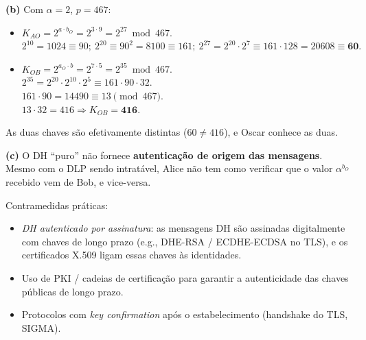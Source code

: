 \documentclass[12pt,a4paper]{article}
\begin{document}
\begin{exercicio}[breakable]
\begin{resposta}
\textbf{(b)} Com $\alpha = 2$, $p = 467$:
\begin{itemize}[leftmargin=1.4em,topsep=2pt,itemsep=1pt]
    \item $K_{AO} = 2^{a \cdot b_O} = 2^{3 \cdot 9} = 2^{27} \bmod 467.$ \\
    $2^{10} = 1024 \equiv 90;\ 2^{20} \equiv 90^{2} = 8100 \equiv 161;\ 2^{27} = 2^{20}\cdot 2^{7} \equiv 161 \cdot 128 = 20608 \equiv \mathbf{60}.$
    \item $K_{OB} = 2^{a_O \cdot b} = 2^{7 \cdot 5} = 2^{35} \bmod 467.$ \\
    $2^{35} = 2^{20}\cdot 2^{10}\cdot 2^{5} \equiv 161 \cdot 90 \cdot 32.$ \\
    $161 \cdot 90 = 14490 \equiv 13 \pmod{467}.$ \\
    $13 \cdot 32 = 416 \Rightarrow K_{OB} = \mathbf{416}.$
\end{itemize}
As duas chaves s\~{a}o efetivamente distintas ($60 \ne 416$), e Oscar conhece as duas.

\textbf{(c)} O DH ``puro'' n\~{a}o fornece \textbf{autentica\c{c}\~{a}o de origem das mensagens}. Mesmo com o DLP sendo intrat\'{a}vel, Alice n\~{a}o tem como verificar que o valor $\alpha^{b_O}$ recebido vem de Bob, e vice-versa.

Contramedidas pr\'{a}ticas:
\begin{itemize}[leftmargin=1.4em,topsep=2pt,itemsep=1pt]
    \item \emph{DH autenticado por assinatura}: as mensagens DH s\~{a}o assinadas digitalmente com chaves de longo prazo (e.g., DHE-RSA / ECDHE-ECDSA no TLS), e os certificados X.509 ligam essas chaves \`{a}s identidades.
    \item Uso de PKI / cadeias de certifica\c{c}\~{a}o para garantir a autenticidade das chaves p\'{u}blicas de longo prazo.
    \item Protocolos com \emph{key confirmation} ap\'{o}s o estabelecimento (handshake do TLS, SIGMA).
\end{itemize}
\end{resposta}
\end{exercicio}
\end{document}
